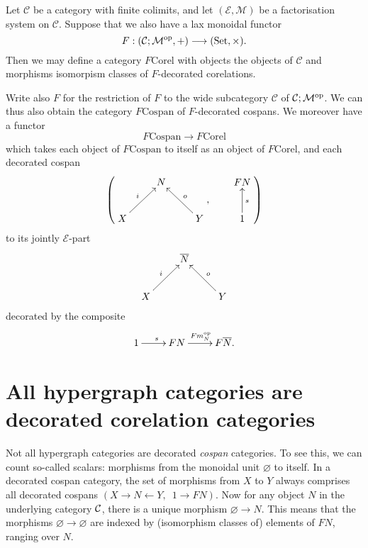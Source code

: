 \begin{corollary}
  Let $\mathcal C$ be a category with finite colimits, and let $(\mathcal E,
  \mathcal M)$ be a factorisation system on $\mathcal C$. Suppose that we also
  have a lax monoidal functor
  \[
    F: (\mathcal C;\mathcal M^{\mathrm{op}},+) \longrightarrow (\mathrm{Set}, \times).
  \]
  Then we may define a category $F\mathrm{Corel}$ with objects the objects of
  $\mathcal C$ and morphisms isomorpism classes of $F$-decorated corelations.

  Write also $F$ for the restriction of $F$ to the wide subcategory $\mathcal
  C$ of $\mathcal C;\mathcal M^{\mathrm{op}}$. We can thus also obtain the category
  $F\mathrm{Cospan}$ of
  $F$-decorated cospans. We moreover have a functor 
  \[
    F\mathrm{Cospan} \to F\mathrm{Corel}
  \]
  which takes each object of $F\mathrm{Cospan}$ to itself as an object of
  $F\mathrm{Corel}$, and each decorated cospan
  \[
    \left(
    \begin{aligned}
      \xymatrix{
	& N \\  
	X \ar[ur]^{i} && Y \ar[ul]_{o}
      }
    \end{aligned}
    ,
    \qquad
    \begin{aligned}
      \xymatrix{
	FN \\
	1 \ar[u]_{s}
      }
    \end{aligned}
    \right)
  \]  
  to its jointly $\mathcal E$-part
  \[
    \xymatrix{
      & \overline{N} \\  
      X \ar[ur]^{i} && Y \ar[ul]_{o}
    }
  \]
  decorated by the composite
  \[
    \xymatrix{
      1 \ar[r]^s & FN \ar[r]^{Fm_N^\opp} & F\overline{N}.
    }
  \]
\end{corollary}


\section{All hypergraph categories are decorated corelation categories}
\label{sec.allhypergraphs}

Not all hypergraph categories are decorated \emph{cospan} categories. To see
this, we can count so-called scalars: morphisms from the monoidal unit
$\varnothing$ to itself. In a decorated cospan category, the set of morphisms
from $X$ to $Y$ always comprises all decorated cospans $(X \to N \leftarrow
Y,\enspace 1 \to FN)$. Now for any object $N$ in the underlying category $\mathcal
C$, there is a unique morphism $\varnothing \to N$. This means that the
morphisms $\varnothing \to \varnothing$ are indexed by (isomorphism classes of)
elements of $FN$, ranging over $N$.

